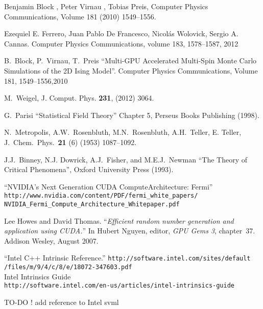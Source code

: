 \documentclass[a4paper]{llncs}
\begin{document}
\begin{thebibliography}{9}


Benjamin Block , Peter Virnau , Tobias Preis, Computer Physics
Communications, Volume 181 (2010) 1549–1556.

Ezequiel E. Ferrero, Juan Pablo De Francesco, Nicolás Wolovick,
Sergio A. Cannas. Computer Physics Communications, volume 183, 1578--1587, 2012

B.~Block, P.~Virnau, T.~Preis ``Multi-GPU Accelerated
Multi-Spin Monte Carlo Simulations of the 2D Ising Model''. Computer Physics
Communications, Volume 181, 1549--1556,2010

 M.~Weigel, J. Comput. Phys. \textbf{231},  (2012) 3064.

 G.~Parisi ``Statistical Field Theory'' Chapter 5, Perseus
Books Publishing (1998).

 N.~Metropolis, A.W.~Rosenbluth, M.N.~Rosenbluth,
A.H.~Teller, E. Teller, J.~Chem.~Phys.~\textbf{21} (6) (1953) 1087--1092.

 J.J.~Binney, N.J. Dowrick, A.J.~Fisher, and M.E.J.~Newman
``The Theory of Critical Phenomena'', Oxford University Press (1993).

 ``NVIDIA's Next Generation CUDA ComputeArchitecture: Fermi'' \\
\verb!http://www.nvidia.com/content/PDF/fermi_white_papers/!\\
\verb!NVIDIA_Fermi_Compute_Architecture_Whitepaper.pdf!

 Lee Howes and David Thomas. ``{\em Efficient random
number generation and application using {CUDA}.}'' In Hubert Nguyen, editor,
{\em GPU Gems 3}, chapter~37. Addison Wesley, August 2007.

 ``Intel C++ Intrinsic Reference.''
\verb!http://software.intel.com/sites/default!\\
\verb!/files/m/9/4/c/8/e/18072-347603.pdf! \\
Intel Intrinsics Guide\\
\verb!http://software.intel.com/en-us/articles/intel-intrinsics-guide!

 TO-DO ! add reference to Intel svml

\end{thebibliography}
\end{document}

